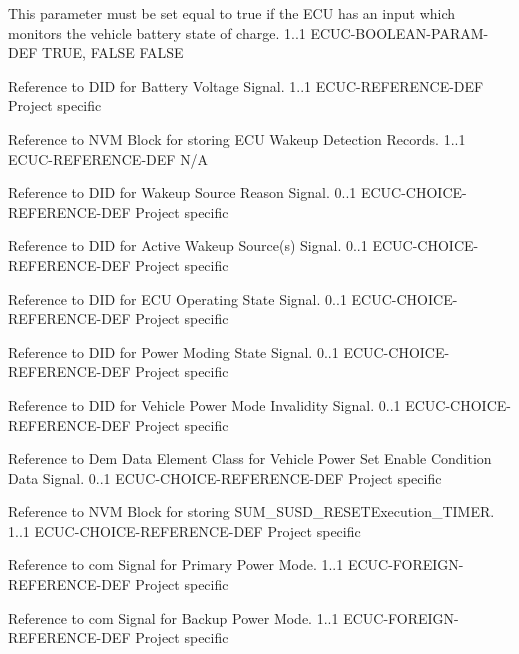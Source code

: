 {This parameter must be set equal to true if the ECU has an input which monitors the vehicle battery state of charge.}
{1..1}
{ECUC-BOOLEAN-PARAM-DEF}
{TRUE, FALSE}
{FALSE}

{Reference to DID for Battery Voltage Signal.}
{1..1}
{ECUC-REFERENCE-DEF}
{Project specific}
{}

{
{Reference to NVM Block for storing ECU Wakeup Detection Records.}
{1..1}
{ECUC-REFERENCE-DEF}
{N/A}
{}}
{}

{Reference to DID for Wakeup Source Reason Signal.}
{0..1}
{ECUC-CHOICE-REFERENCE-DEF}
{Project specific}
{}

{Reference to DID for Active Wakeup Source(s) Signal.}
{0..1}
{ECUC-CHOICE-REFERENCE-DEF}
{Project specific}
{}


{Reference to DID for ECU Operating State Signal.}
{0..1}
{ECUC-CHOICE-REFERENCE-DEF}
{Project specific}
{}

{Reference to DID for Power Moding State Signal.}
{0..1}
{ECUC-CHOICE-REFERENCE-DEF}
{Project specific}
{}

{Reference to DID for Vehicle Power Mode Invalidity Signal.}
{0..1}
{ECUC-CHOICE-REFERENCE-DEF}
{Project specific}
{}

{Reference to Dem Data Element Class for Vehicle Power Set Enable Condition Data Signal.}
{0..1}
{ECUC-CHOICE-REFERENCE-DEF}
{Project specific}
{}

{Reference to NVM Block for storing SUM_SUSD_RESETExecution_TIMER.}
{1..1}
{ECUC-CHOICE-REFERENCE-DEF}
{Project specific}
{}

{Reference to com Signal for Primary Power Mode.}
{1..1}
{ECUC-FOREIGN-REFERENCE-DEF}
{Project specific}
{}

{Reference to com Signal for Backup Power Mode.}
{1..1}
{ECUC-FOREIGN-REFERENCE-DEF}
{Project specific}
{}

